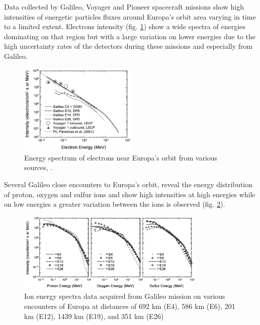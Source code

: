 Data collected by Galileo, Voyager and Pioneer spacecraft missions show high intensities of energetic particles fluxes around Europa’s orbit area varying in time to a limited extent. Electrons intensity (fig. \ref{electrons energy}) show a wide spectra of energies dominating on that region but with a large variation on lower energies due to the high uncertainty rates of the detectors during these missions and especially from Galileo.
\begin{figure}[htb]
\centering
\includegraphics[width=0.5\textwidth]{figures/Orbiter/electrons_energy_spectrum}
\caption{Energy spectrum of electrons near Europa’s orbit from various sources, \cite{paranicas2009europa}.}
\label{electrons energy}
\end{figure}
Several Galileo close encounters to Europa’s orbit, reveal the energy distribution of proton, oxygen and sulfur ions and show high intensities at high energies while on low energies a greater variation between the ions is observed (fig. \ref{fig:ions_energy}).
\begin{figure}[htb]
    \centering
    \includegraphics[width=0.80\textwidth]{figures/Orbiter/ions_energy}
    \caption{Ion energy spectra data acquired from Galileo mission on various encounters of Europa at distances of 692 km (E4), 586 km (E6), 201 km (E12), 1439 km (E19), and 351 km (E26) \cite{paranicas2009europa}}
    \label{fig:ions_energy}
\end{figure}
